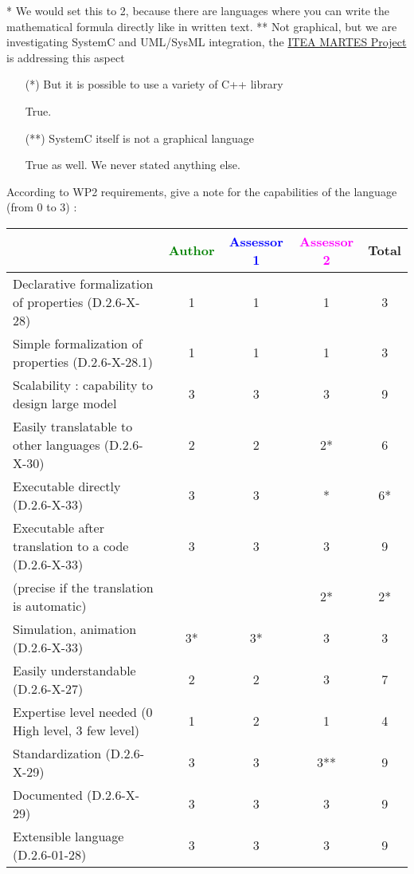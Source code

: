 \begin{author_comment}
* We would set this to 2, because there are languages where you can write the mathematical formula directly like in written text.
** Not graphical, but we are investigating SystemC and UML/SysML integration, the \href{http://www.martes-idea.org/}{ITEA MARTES Project} is addressing this aspect
\end{author_comment}
\begin{assessor1}
\begin{itemize}
\item[(*)] But it is possible to use a variety of C++ library
\begin{author_comment}
True.
\end{author_comment}
\item[(**)] SystemC itself is not a graphical language
\begin{author_comment}
True as well. We never stated anything else.
\end{author_comment}
\end{itemize}
\end{assessor1}

According to WP2 requirements, give a note for the capabilities of the language (from 0 to 3) :

\begin{tabular}{|l | c | c | c | c|}
  \hline
  & \textcolor{green}{Author} & \textcolor{blue}{Assessor 1} & \textcolor{magenta}{Assessor 2} & Total \\
  \hline
  Declarative formalization of properties (D.2.6-X-28) &1 &1 & 1& 3 \\
  \hline
  Simple formalization of properties (D.2.6-X-28.1) &1 &1 &1 & 3 \\
  \hline
  Scalability : capability to design large model &3 &3 & 3 & 9 \\
  \hline
  Easily translatable to other languages (D.2.6-X-30) & 2 & 2  & 2* & 6 \\
  \hline
  Executable directly (D.2.6-X-33) &3 & 3  & * & 6* \\
  \hline
  Executable after translation to a code (D.2.6-X-33) &3 &3 &3 & 9 \\
  (precise if the translation is automatic) & & & 2*& 2*\\
  \hline
  Simulation, animation (D.2.6-X-33) &3* &3* &3 & 3 \\
  \hline
  Easily understandable (D.2.6-X-27) &2 &2 &3 & 7 \\
  \hline
  Expertise level needed (0 High level, 3 few level) &1 &2 &1 & 4 \\
  \hline
  Standardization (D.2.6-X-29) &3 &3 &3** & 9 \\
  \hline
  Documented (D.2.6-X-29) &3 &3 &3 & 9 \\
  \hline
  Extensible language (D.2.6-01-28) &3 &3 &3 & 9 \\
  \hline
\end{tabular}

